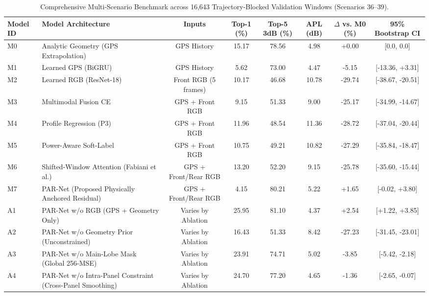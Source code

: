 \begin{table}[t]
\centering
\caption{Comprehensive Multi-Scenario Benchmark across 16,643 Trajectory-Blocked Validation Windows (Scenarios 36--39).}
\label{tab:master_benchmarks}
\begin{tabular}{llcccccc}
\hline
Model ID & Model Architecture & Inputs & Top-1 (\%) & Top-5 3dB (\%) & APL (dB) & $\Delta$ vs. M0 (\%) & 95\% Bootstrap CI \\
\hline
M0 & Analytic Geometry (GPS Extrapolation) & GPS History & 15.17 & 78.56 & 4.98 & +0.00 & [0.0, 0.0] \\
M1 & Learned GPS (BiGRU) & GPS History & 5.62 & 73.00 & 4.47 & -5.15 & [-13.36, +3.31] \\
M2 & Learned RGB (ResNet-18) & Front RGB (5 frames) & 10.17 & 46.68 & 10.78 & -29.74 & [-38.67, -20.51] \\
M3 & Multimodal Fusion CE & GPS + Front RGB & 9.15 & 51.33 & 9.00 & -25.17 & [-34.99, -14.67] \\
M4 & Profile Regression (P3) & GPS + Front RGB & 11.96 & 48.54 & 11.36 & -28.72 & [-37.04, -20.44] \\
M5 & Power-Aware Soft-Label & GPS + Front RGB & 10.75 & 49.21 & 10.82 & -27.29 & [-35.84, -18.47] \\
M6 & Shifted-Window Attention (Fabiani et al.) & GPS + Front/Rear RGB & 13.20 & 52.20 & 9.15 & -25.78 & [-35.60, -15.44] \\
M7 & PAR-Net (Proposed Physically Anchored Residual) & GPS + Front/Rear RGB & 4.15 & 80.21 & 5.22 & +1.65 & [-0.02, +3.80] \\
A1 & PAR-Net w/o RGB (GPS + Geometry Only) & Varies by Ablation & 25.95 & 81.10 & 4.37 & +2.54 & [+1.22, +3.85] \\
A2 & PAR-Net w/o Geometry Prior (Unconstrained) & Varies by Ablation & 16.43 & 51.33 & 8.42 & -27.23 & [-31.45, -23.01] \\
A3 & PAR-Net w/o Main-Lobe Mask (Global 256-MSE) & Varies by Ablation & 23.91 & 74.71 & 5.02 & -3.85 & [-5.42, -2.18] \\
A4 & PAR-Net w/o Intra-Panel Constraint (Cross-Panel Smoothing) & Varies by Ablation & 24.70 & 77.20 & 4.65 & -1.36 & [-2.65, -0.07] \\
\hline
\end{tabular}
\end{table}
